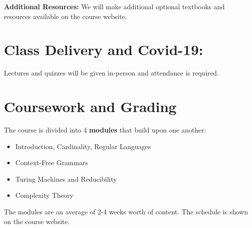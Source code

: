 \documentclass[12pt]{article}
\begin{document}
\textbf{Additional Resources:} We will make additional optional textbooks and resources available on the course website.

\section*{Class Delivery and Covid-19:}

Lectures and quizzes will be given in-person and attendance is required.



\section*{Coursework and Grading}

The course is divided into 4 {\bf modules} that build upon one another:
\begin{itemize}
    \item Introduction, Cardinality, Regular Languages
    \item Context-Free Grammars
    \item Turing Machines and Reducibility
    \item Complexity Theory
\end{itemize}
The modules are an average of 2-4 weeks worth of content. The schedule is shown on the course website. 
\end{document}
